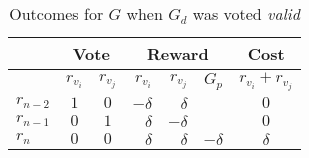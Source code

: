 \begin{table}[hbt]
    \caption{Outcomes for $G$ when $G_d$ was voted \emph{valid}}
    \begin{tabular}{lccrrrc}
    \toprule
        \hspace   & \multicolumn{2}{c}{Vote} & \multicolumn{3}{c}{Reward} & Cost                     \\
    \midrule
        \hspace   & $r_{v_i}$  & $r_{v_j}$   & $r_{v_i}$ & $r_{v_j}$ & $G_p$     & $r_{v_i}+r_{v_j}$ \\
    \addlinespace[0.5em]
        $r_{n-2}$ & $1$        & $0$         & $-\delta$ & $\delta$  &           & $0$               \\
        $r_{n-1}$ & $0$        & $1$         & $\delta$  & $-\delta$ &           & $0$               \\
        $r_{n}$   & $0$        & $0$         & $\delta$  & $\delta$  & $-\delta$ & $\delta$          \\
    \bottomrule
    \end{tabular}
\end{table}

